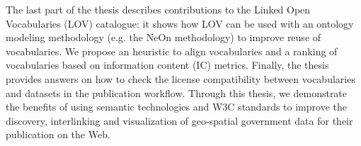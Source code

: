 The last part of the thesis describes contributions to the Linked Open Vocabularies (LOV) catalogue: it shows how LOV can be used with an ontology modeling methodology (e.g. the NeOn methodology) to improve reuse of vocabularies. We propose an heuristic to align vocabularies and a ranking of vocabularies based on information content (IC) metrics. Finally, the thesis provides answers on how to check the license compatibility between vocabularies and datasets in the publication workflow. Through this thesis, we demonstrate the benefits of using semantic technologies and W3C standards to improve the discovery, interlinking and visualization of geo-spatial government data for their publication on the Web.